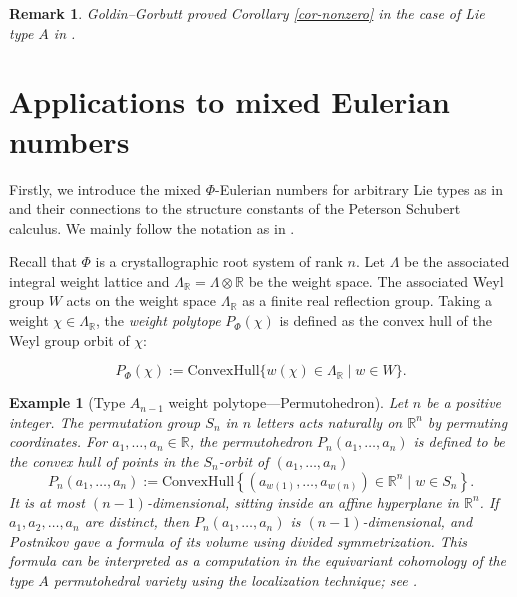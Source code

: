 \documentclass[11pt, letterpaper]{amsart}
\numberwithin{equation}{section}
\newtheorem{eg}[theorem]{Example}
\newtheorem{remark}[theorem]{Remark}
\begin{document}
\begin{remark}
    Goldin--Gorbutt proved Corollary \ref{cor-nonzero} in the case of Lie type $A$ in \cite[Theorem 8]{goldin2022positive}.
\end{remark}

\section{Applications to mixed Eulerian numbers} \label{sec-Applications}
Firstly, we introduce the mixed $\Phi$-Eulerian numbers for arbitrary Lie types as in \cite{postnikov2009permutohedra} and their connections to the structure constants of the Peterson Schubert calculus. We mainly follow the notation as in \cite{Horiguchi2024mixed}.

Recall that \(\Phi\) is a crystallographic root system of rank \(n\). Let \(\Lambda\) be the associated integral weight lattice and \(\Lambda_{\mathbb{R}} = \Lambda \otimes \mathbb{R}\) be the weight space. The associated Weyl group \(W\) acts on the weight space \(\Lambda_{\mathbb{R}}\)  as a finite real reflection group. Taking a weight \(\chi \in \Lambda_{\mathbb{R}}\), the \emph{weight polytope} \(P_\Phi(\chi)\) is defined as the convex hull of the Weyl group orbit of \(\chi\):

\[P_\Phi(\chi) := \mathrm{ConvexHull}\{w(\chi) \in \Lambda_{\mathbb{R}} \mid w \in W\}.\]

\begin{eg}[Type $A_{n-1}$ weight polytope---Permutohedron] 
Let $n$ be a positive integer. The permutation group $S_n$ in $n$ letters acts naturally on $\mathbb{R}^n$ by permuting coordinates. For $a_1, \ldots, a_n \in \mathbb{R}$, the \emph{permutohedron} $P_n\left(a_1, \ldots, a_n\right)$ is defined to be the convex hull of points in the $S_n$-orbit of  $(a_1, \ldots, a_n)$
\[
P_n\left(a_1, \ldots, a_n\right):= \mathrm{ConvexHull}\left\{\left(a_{w(1)}, \ldots, a_{w(n)}\right) \in \mathbb{R}^n \mid w \in S_n\right\}.
\]
It is at most $(n-1)$-dimensional, sitting inside an affine hyperplane in $\mathbb{R}^n$. If $a_1, a_2, \ldots, a_n$ are distinct, then $P_n\left(a_1, \ldots, a_n\right)$ is $(n-1)$-dimensional, and Postnikov gave a formula \cite[Theorem 3.1]{postnikov2009permutohedra} of its volume using \emph{divided symmetrization}. This formula can be interpreted as a computation in the equivariant cohomology of the type $A$ permutohedral variety using the localization technique; see \cite[Section 3]{Horiguchi2024mixed}.
\end{eg}
\end{document}

